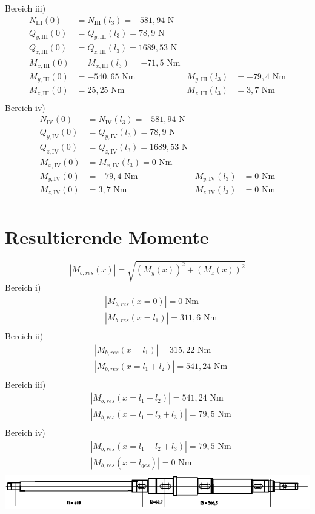 Bereich iii)
\begin{align*}
	N_{\mathrm{III}} (0) &= N_{\mathrm{III}} (l_3) = -581,94 \text{ N}\\
	Q_{y,\mathrm{III}} (0) &= Q_{y,\mathrm{III}} (l_3) =78,9\text{ N}\\
	Q_{z,\mathrm{III}} (0) &= Q_{z,\mathrm{III}} (l_3) = 1689,53\text{ N}\\
	M_{x,\mathrm{III}} (0) &= M_{x,\mathrm{III}} (l_3) = -71,5\text{ Nm}\\
	M_{y,\mathrm{III}} (0) &=  -540,65\text{ Nm} & M_{y,\mathrm{III}} (l_3) &= -79,4\text{ Nm}\\
	M_{z,\mathrm{III}} (0) &= 25,25\text{ Nm} &M_{z,\mathrm{III}} (l_3) &= 3,7\text{ Nm}\\
\end{align*}
Bereich iv)
\begin{align*}
	N_{\mathrm{IV}} (0) &= N_{\mathrm{IV}} (l_3) = -581,94 \text{ N}\\
	Q_{y,\mathrm{IV}} (0) &= Q_{y,\mathrm{IV}} (l_3) = 78,9\text{ N}\\
	Q_{z,\mathrm{IV}} (0) &= Q_{z,\mathrm{IV}} (l_3) = 1689,53\text{ N}\\
	M_{x,\mathrm{IV}} (0) &= M_{x,\mathrm{IV}} (l_3) = 0\text{ Nm}\\
	M_{y,\mathrm{IV}} (0) &=  -79,4\text{ Nm} & M_{y,\mathrm{IV}} (l_3) &= 0\text{ Nm}\\
	M_{z,\mathrm{IV}} (0) &= 3,7\text{ Nm} &M_{z,\mathrm{IV}} (l_3) &= 0\text{ Nm}\\
\end{align*}
\newpage
\section{Resultierende Momente}
\[
	|M_{b,res}(x)| = \sqrt{\left( M_{y}(x) \right)^2 + \left( M_{z}(x) \right)^2 }
\]
Bereich i)
\begin{align*}
	&|M_{b,res}(x=0)| = 0 \text{ Nm} \\
	&|M_{b,res}(x=l_1)| = 311,6 \text{ Nm} \\
\end{align*}
Bereich ii)
\begin{align*}
	&|M_{b,res}(x=l_1)| = 315,22 \text{ Nm} \\
	&|M_{b,res}(x=l_1+l_2)| = 541,24 \text{ Nm} \\
\end{align*}
Bereich iii)
\begin{align*}
	&|M_{b,res}(x=l_1+l_2)| = 541,24 \text{ Nm} \\
	&|M_{b,res}(x=l_1+l_2+l_3)| = 79,5 \text{ Nm} \\
\end{align*}
Bereich iv)
\begin{align*}
	&|M_{b,res}(x=l_1+l_2+l_3)| = 79,5 \text{ Nm} \\
	&|M_{b,res}(x=l_{ges})| = 0 \text{ Nm} \\
\end{align*}
\includegraphics[width=\textwidth,keepaspectratio]{figures/Welle1klein.png}